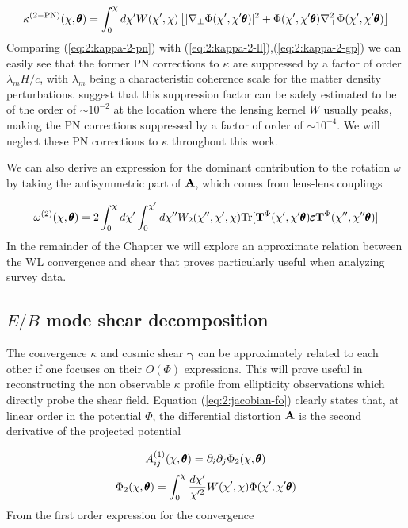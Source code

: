 \begin{equation}
\label{eq:2:kappa-2-pn}
\kappa^{(2-{\rm PN})}(\chi,\pmb{\theta}) = \int_0^\chi d\chi' W(\chi',\chi)\left[\vert\nabla_\perp\Phi(\chi',\chi'\pmb{\theta})\vert^2+\Phi(\chi',\chi'\pmb{\theta})\nabla_\perp^2\Phi(\chi',\chi'\pmb{\theta})\right]
\end{equation}
%
Comparing (\ref{eq:2:kappa-2-pn}) with (\ref{eq:2:kappa-2-ll}),(\ref{eq:2:kappa-2-gp}) we can easily see that the former PN corrections to $\kappa$ are suppressed by a factor of order $\lambda_m H/c$, with $\lambda_m$ being a characteristic coherence scale for the matter density perturbations. \citep{PNLensing} suggest that this suppression factor can be safely estimated to be of the order of $\sim 10^{-2}$ at the location where the lensing kernel $W$ usually peaks, making the PN corrections suppressed by a factor of order of $\sim 10^{-4}$. We will neglect these PN corrections to $\kappa$ throughout this work.  

We can also derive an expression for the dominant contribution to the rotation $\omega$ by taking the antisymmetric part of $\mathbf{A}$, which comes from lens-lens couplings

\begin{equation}
\label{eq:2:omega-2-ll}
\omega^{(2)}(\chi,\pmb{\theta}) = 2\int_0^\chi d\chi'\int_0^{\chi'}d\chi'' W_2(\chi'',\chi',\chi){\rm Tr}[\mathbf{T}^{\Phi}(\chi',\chi'\pmb{\theta})\pmb{\varepsilon}\mathbf{T}^{\Phi}(\chi'',\chi''\pmb{\theta})]
\end{equation} 
%
In the remainder of the Chapter we will explore an approximate relation between the WL convergence and shear that proves particularly useful when analyzing survey data.

\subsection{$E/B$ mode shear decomposition}
The convergence $\kappa$ and cosmic shear $\pmb{\gamma}$ can be approximately related to each other if one focuses on their $O(\Phi)$ expressions. This will prove useful in reconstructing the non observable $\kappa$ profile from ellipticity observations which directly probe the shear field. Equation (\ref{eq:2:jacobian-fo}) clearly states that, at linear order in the potential $\Phi$, the differential distortion $\mathbf{A}$ is the second derivative of the projected potential 

\begin{equation}
\label{eq:2:projection-fo-1}
A^{(1)}_{ij}(\chi,\pmb{\theta}) = \partial_i\partial_j \Phi_2(\chi,\pmb{\theta}) \\ \\
\end{equation}
%
\begin{equation}
\label{eq:2:projection-fo-2}
\Phi_2(\chi,\pmb{\theta}) = \int_0^\chi \frac{d\chi'}{\chi'^2} W(\chi',\chi)\Phi(\chi',\chi'\pmb{\theta})
\end{equation}
%
From the first order expression for the convergence

